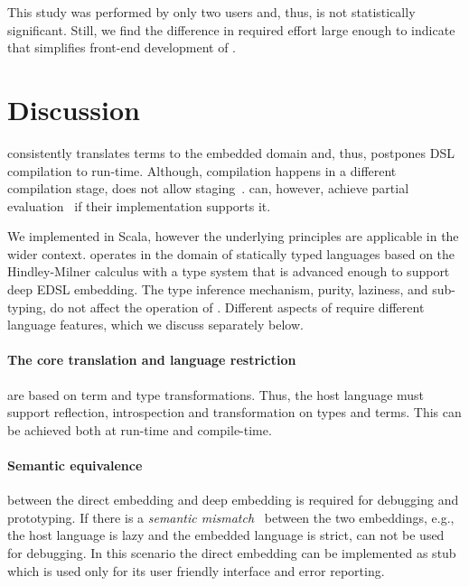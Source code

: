 This study was performed by only two users and, thus, is not statistically
significant. Still, we find the difference in required effort large enough to indicate that \yy
simplifies front-end development of \edsls.


\section{Discussion}
\label{sec:other-languages}


\yy consistently translates terms to the embedded domain and, thus, postpones
DSL compilation to run-time. Although, compilation happens in a different
compilation stage, \yy does not allow staging~\cite{taha_multi-stage_1997}.
\edsls can, however, achieve partial evaluation~\cite{jones1993partial} if their
implementation supports it.

We implemented \yy in Scala, however the underlying principles are applicable
in the wider context. \yy operates in the domain of statically typed languages
based on the Hindley-Milner calculus with a type system that is advanced enough
to support deep EDSL embedding. The type inference mechanism, purity, laziness,
and sub-typing, do not affect the operation of \yy. Different aspects of \yy
require different language features, which we discuss separately below.

\paragraph{The core translation and language restriction} are based on term and
type transformations. Thus, the host language must support reflection,
introspection and transformation on types and terms. This can be achieved both
at run-time and compile-time.

\paragraph{Semantic equivalence} between the direct embedding and deep embedding
is required for debugging and prototyping. If there is a \emph{semantic mismatch}~\cite{czarnecki_dsl_2004}
 between the two embeddings, e.g., the host language is lazy and the embedded
 language is strict, \yy can not be used for debugging. In this scenario the
 direct embedding can be implemented as stub which is used only for its user
 friendly interface and error reporting.

